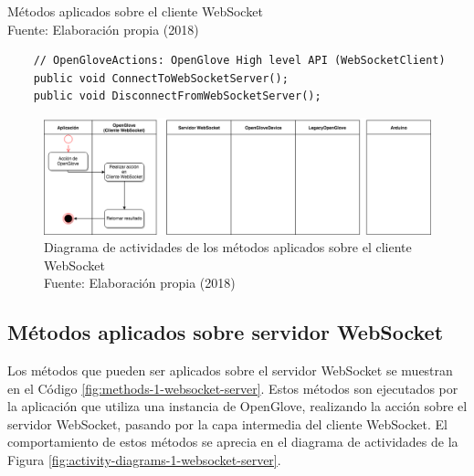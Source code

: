 \begin{algorithm}[!ht]
   \captionsetup{justification=centering}
   \begin{center}
    \caption[Métodos aplicados sobre el cliente WebSocket]{Métodos aplicados sobre el cliente WebSocket \\ \tab[4cm] Fuente:
     Elaboración propia (2018)}
    \end{center}
    \label{fig:methods-0-api-hl}
      \begin{lstlisting}
	// OpenGloveActions: OpenGlove High level API (WebSocketClient)
	public void ConnectToWebSocketServer();
	public void DisconnectFromWebSocketServer();
	\end{lstlisting}
\end{algorithm}



\begin{figure}[H]
  \begin{center} 
   	\includegraphics[width=1.0\textwidth]{images/chapter04/ActivityDiagrams-OpenGloveActions-0.png} 
   	\captionsetup{justification=centering}
    \caption[Diagrama de actividades de los métodos aplicados sobre el cliente WebSocket]{Diagrama de actividades de los métodos aplicados sobre el cliente WebSocket\\Fuente: Elaboración propia (2018)}
    \label{fig:activity-diagrams-0-api-hl}
  \end{center}
\end{figure}




\subsection{Métodos aplicados sobre servidor WebSocket}
\label{subsection:method-websocket-server}
Los métodos que pueden ser aplicados sobre el servidor WebSocket se muestran en el Código \ref{fig:methods-1-websocket-server}. Estos métodos son ejecutados por la aplicación que utiliza una instancia de OpenGlove, realizando la acción sobre el servidor WebSocket, pasando por la capa intermedia del cliente WebSocket. El comportamiento de estos métodos se aprecia en el diagrama de actividades de la Figura \ref{fig:activity-diagrams-1-websocket-server}.




